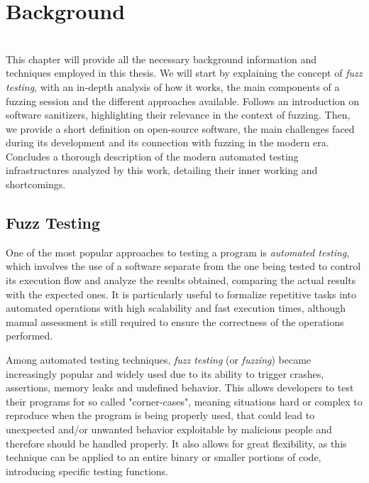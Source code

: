 \chapter{Background} \label{chap_2}
\ \\
This chapter will provide all the necessary background information and techniques employed in this thesis.
We will start by explaining the concept of \textit{fuzz testing}, with an in-depth analysis of how it works, the main components of a fuzzing session and the different approaches available.
Follows an introduction on software sanitizers, highlighting their relevance in the context of fuzzing.
Then, we provide a short definition on open-source software, the main challenges faced during its development and its connection with fuzzing in the modern era.
Concludes a thorough description of the modern automated testing infrastructures analyzed by this work, detailing their inner working and shortcomings.





\section{Fuzz Testing}
One of the most popular approaches to testing a program is \textit{automated testing}, which involves the use of a software separate from the one being tested to control its execution flow and analyze the results obtained, comparing the actual results with the expected ones. It is particularly useful to formalize repetitive tasks into automated operations with high scalability and fast execution times, although manual assessment is still required to ensure the correctness of the operations performed. 

Among automated testing techniques, \textit{fuzz testing} (or \textit{fuzzing}) became increasingly popular and widely used due to its ability to trigger crashes, assertions, memory leaks and undefined behavior. This allows developers to test their programs for so called "corner-cases", meaning situations hard or complex to reproduce when the program is being properly used, that could lead to unexpected and/or unwanted behavior exploitable by malicious people and therefore should be handled properly. It also allows for great flexibility, as this technique can be applied to an entire binary or smaller portions of code, introducing specific testing functions.


